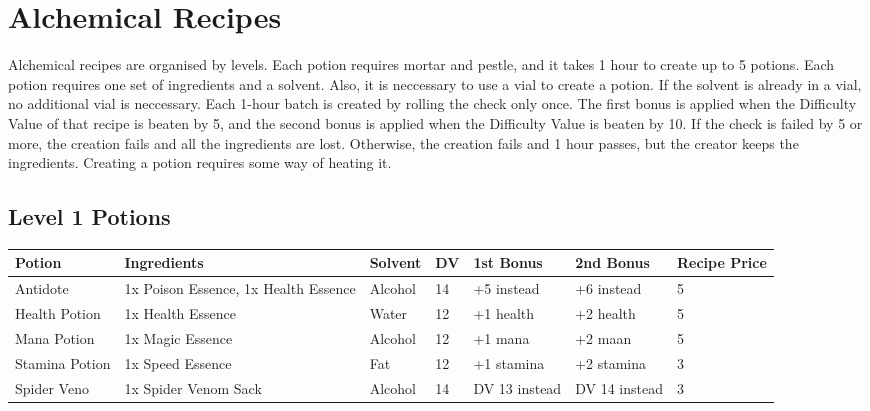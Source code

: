\section{Alchemical Recipes}

Alchemical recipes are organised by levels. Each potion requires mortar and pestle, and it takes 1 hour to create up to 5 potions. Each potion requires one set of ingredients and a solvent. Also, it is neccessary to use a vial to create a potion. If the solvent is already in a vial, no additional vial is neccessary.
Each 1-hour batch is created by rolling the check only once. 
The first bonus is applied when the Difficulty Value of that recipe is beaten by 5, and the second bonus is applied when the Difficulty Value is beaten by 10. 
If the check is failed by 5 or more, the creation fails and all the ingredients are lost. Otherwise, the creation fails and 1 hour passes, but the creator keeps the ingredients. Creating a potion requires some way of heating it.\\


\subsection{Level 1 Potions}
\begin{longtable}{l | p{2.5cm} | l | l | p{1.5cm} | p{1.5cm} | p{1cm} }
	Potion & Ingredients & Solvent & DV & 1st Bonus & 2nd Bonus & Recipe Price\\ \hline
	Antidote & 1x Poison Essence, 1x Health Essence & Alcohol & 14 & +5 instead & +6 instead & 5\\
	Health Potion & 1x Health Essence & Water & 12 & +1 health & +2 health & 5\\
	Mana Potion & 1x Magic Essence & Alcohol & 12 & +1 mana & +2 maan & 5\\
	Stamina Potion & 1x Speed Essence & Fat & 12 & +1 stamina & +2 stamina & 3\\
	Spider Veno & 1x Spider Venom Sack & Alcohol & 14 & DV 13 instead & DV 14 instead & 3\\
\end{longtable}